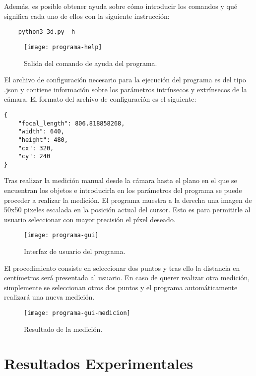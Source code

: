 \documentclass[]{article}
\begin{document}
\noindent Además, es posible obtener ayuda sobre cómo introducir los comandos y qué significa cada uno de ellos con la siguiente instrucción:

\begin{verbatim}
	python3 3d.py -h
\end{verbatim}

\begin{figure}[H]
	\centering
	\texttt{[image: programa-help]}
	\caption{Salida del comando de ayuda del programa.}
	\label{fig:programa-help}
\end{figure}

El archivo de configuración necesario para la ejecución del programa es del tipo .json y contiene información sobre los parámetros intrínsecos y extrínsecos de la cámara. El formato del archivo de configuración es el siguiente:

\begin{verbatim}
{
	"focal_length": 806.818858268,
	"width": 640,
	"height": 480,
	"cx": 320,
	"cy": 240
}
\end{verbatim}

Tras realizar la medición manual desde la cámara hasta el plano en el que se encuentran los objetos e introducirla en los parámetros del programa se puede proceder a realizar la medición. El programa muestra a la derecha una imagen de 50x50 pixeles escalada en la posición actual del cursor. Esto es para permitirle al usuario seleccionar con mayor precisión el píxel deseado.

\begin{figure}[H]
	\centering
	\texttt{[image: programa-gui]}
	\caption{Interfaz de usuario del programa.}
	\label{fig:programa-gui}
\end{figure}

El procedimiento consiste en seleccionar dos puntos y tras ello la distancia en centímetros será presentada al usuario. En caso de querer realizar otra medición, simplemente se seleccionan otros dos puntos y el programa automáticamente realizará una nueva medición.

\begin{figure}[H]
	\centering
	\texttt{[image: programa-gui-medicion]}
	\caption{Resultado de la medición.}
	\label{fig:programa-gui-medicion}
\end{figure}

\section{Resultados Experimentales}
\end{document}
